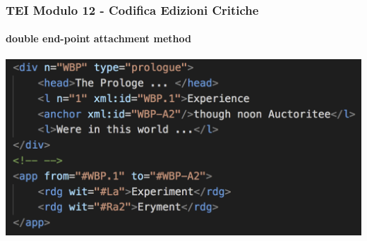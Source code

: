 \begin{frame}
    \frametitle{TEI Modulo 12 - Codifica Edizioni Critiche}
    \framesubtitle{double end-point attachment method}
    \addtocounter{nframe}{1}
    





   
    \begin{center}
       \includegraphics[width=.95\textwidth]{imgs/double-end-point.png}
    \end{center}

\end{frame}



